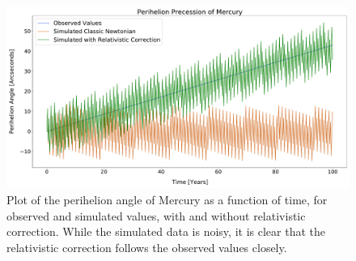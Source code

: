 \documentclass[../main.tex]{subfiles}
\begin{document}
\begin{figure}[htb!]
    \centering
    \includegraphics[width=1.0\textwidth]{../figures/3-10^7 perihelion.pdf}
    \caption{Plot of the perihelion angle of Mercury as a function of time, for observed and simulated values, with and without relativistic correction. While the simulated data is noisy, it is clear that the relativistic correction follows the observed values closely.}
    \label{fig:perihelion-precession}
\end{figure}
\end{document}

